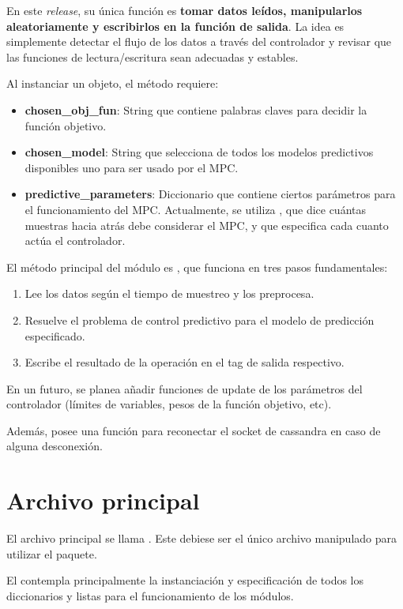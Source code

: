 \documentclass{article}
\begin{document}
En este \emph{release}, su única función es \textbf{tomar datos leídos, manipularlos aleatoriamente y escribirlos en la función de salida}. La idea es simplemente detectar el flujo de los datos a través del controlador y revisar que las funciones de lectura/escritura sean adecuadas y estables.

Al instanciar un objeto, el método  requiere:
\begin{itemize}
\item \textbf{chosen\_obj\_fun}: String que contiene palabras claves para decidir la función objetivo.
\item \textbf{chosen\_model}: String que selecciona de todos los modelos predictivos disponibles uno para ser usado por el MPC.
\item \textbf{predictive\_parameters}: Diccionario que contiene ciertos parámetros para el funcionamiento del MPC. Actualmente, se utiliza , que dice cuántas muestras hacia atrás debe considerar el MPC, y  que especifica cada cuanto actúa el controlador. 
\end{itemize}

El método principal del módulo es , que funciona en tres pasos fundamentales:
\begin{enumerate}
\item Lee los datos según el tiempo de muestreo y los preprocesa.
\item Resuelve el problema de control predictivo para el modelo de predicción especificado.
\item Escribe el resultado de la operación en el tag de salida respectivo.
\end{enumerate}

En un futuro, se planea añadir funciones de update de los parámetros del controlador (límites de variables, pesos de la función objetivo, etc).

Además, posee una función para reconectar el socket de cassandra en caso de alguna desconexión.
\section{Archivo principal}
El archivo principal se llama . Este debiese ser el único archivo manipulado para utilizar el paquete.

El  contempla principalmente la instanciación y especificación de todos los diccionarios y listas para el funcionamiento de los módulos.
\end{document}
